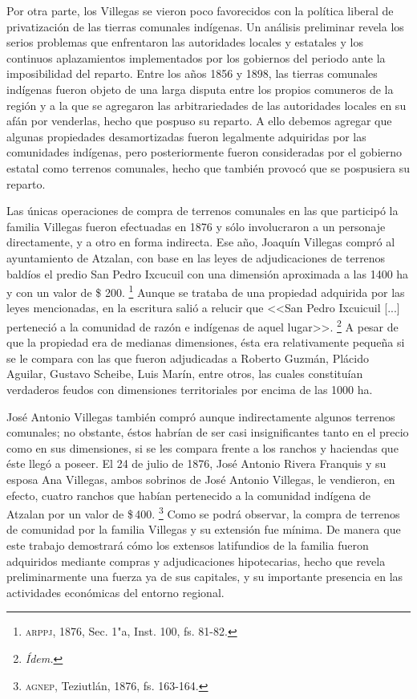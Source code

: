 \documentclass[14pt,twoside,final]{extbook} %
\let\oldfootnote\footnote
\renewcommand\footnote[1]{%
\oldfootnote{\hspace{1mm}#1}}
\begin{document}
Por otra parte, los Villegas se vieron poco favorecidos con la política liberal de privatización de las tierras comunales indígenas. Un análisis preliminar revela los serios problemas que enfrentaron las autoridades locales y estatales y los continuos aplazamientos implementados por los gobiernos del periodo ante la imposibilidad del reparto. Entre los años 1856 y 1898, las tierras comunales indígenas fueron objeto de una larga disputa entre los propios comuneros de la región y a la que se agregaron las arbitrariedades de las autoridades locales en su afán por venderlas, hecho que pospuso su reparto. A ello debemos agregar que algunas propiedades desamortizadas fueron legalmente adquiridas por las comunidades indígenas, pero posteriormente fueron consideradas por el gobierno estatal como terrenos comunales, hecho que también provocó que se pospusiera su reparto. \enlargethispage{\baselineskip}

Las únicas operaciones de compra de terrenos comunales en las que participó la familia Villegas fueron efectuadas en 1876 y sólo involucraron a un personaje directamente, y a otro en forma indirecta. Ese año, Joaquín Villegas compró al ayuntamiento de Atzalan, con base en las leyes de adjudicaciones de terrenos baldíos el predio San Pedro Ixcucuil con una dimensión aproximada a las 1400 ha y con un valor de \$ 200.\footnote{\textsc{arppj}, 1876, Sec. 1"a, Inst. 100, fs. 81-82.} Aunque se trataba de una propiedad adquirida por las leyes mencionadas, en la escritura salió a relucir que <<San Pedro Ixcuicuil [...] perteneció a la comunidad de razón e indígenas de aquel lugar>>.\footnote{\em Ídem.} A pesar de que la propiedad era de medianas dimensiones, ésta era relativamente pequeña si se le compara con las que fueron adjudicadas a Roberto Guzmán, Plácido Aguilar, Gustavo Scheibe, Luis Marín, entre otros, las cuales constituían verdaderos feudos con dimensiones territoriales por encima de las 1000 ha.

José Antonio Villegas también compró aunque indirectamente algunos terrenos comunales; no obstante, éstos habrían de ser casi insignificantes tanto en el precio como en sus dimensiones, si se les compara frente a los ranchos y haciendas que éste llegó a poseer. El 24 de julio de 1876, José Antonio Rivera Franquis y su esposa Ana Villegas, ambos sobrinos de José Antonio Villegas, le vendieron, en efecto, cuatro ranchos que habían pertenecido a la comunidad indígena de Atzalan por un valor de \$\,400.\footnote{\textsc{agnep}, Teziutlán, 1876, fs. 163-164.} Como se podrá observar, la compra de terrenos de comunidad por la familia Villegas y su extensión fue mínima. De manera que este trabajo demostrará cómo los extensos latifundios de la familia fueron adquiridos mediante compras y adjudicaciones hipotecarias, hecho que revela preliminarmente una fuerza ya de sus capitales, y su importante presencia en las actividades económicas del entorno regional.
\end{document}
